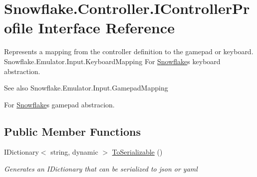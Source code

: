 \hypertarget{interface_snowflake_1_1_controller_1_1_i_controller_profile}{}\section{Snowflake.\+Controller.\+I\+Controller\+Profile Interface Reference}
\label{interface_snowflake_1_1_controller_1_1_i_controller_profile}


Represents a mapping from the controller definition to the gamepad or keyboard. Snowflake.\+Emulator.\+Input.\+Keyboard\+Mapping For \hyperlink{namespace_snowflake}{Snowflake}\textquotesingle{}s keyboard abstraction. \begin{DoxySeeAlso}{See also}
Snowflake.\+Emulator.\+Input.\+Gamepad\+Mapping


\end{DoxySeeAlso}
For \hyperlink{namespace_snowflake}{Snowflake}\textquotesingle{}s gamepad abstracion.  


\subsection*{Public Member Functions}
\begin{DoxyCompactItemize}
\item 
I\+Dictionary$<$ string, dynamic $>$ \hyperlink{interface_snowflake_1_1_controller_1_1_i_controller_profile_a41a6f6f8c58ec249821ef77e58c5d718}{To\+Serializable} ()
\begin{DoxyCompactList}\small\item\em Generates an I\+Dictionary that can be serialized to json or yaml \end{DoxyCompactList}\end{DoxyCompactItemize}
